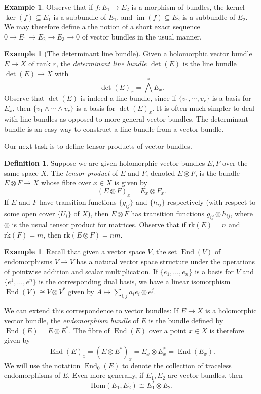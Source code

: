 \documentclass[10pt]{amsart}
\numberwithin{equation}{section}
\newcommand{\im}{\mathop{\mathrm{im}}}
\newcommand{\rk}{\mathrm{rk}}
\newcommand{\Hom}{\mathrm{Hom}}
\DeclareMathOperator{\End}{End}
\theoremstyle{plain}
\theoremstyle{definition}
\newtheorem{defn}[thm]{Definition}
\newtheorem{ex}[thm]{Example}
\theoremstyle{remark}
\begin{document}
\begin{ex}
Observe that if $f: E_1 \to E_2$ is a morphism of bundles, the kernel $\ker(f) \subseteq E_1$ is a subbundle of $E_1$, and $\im(f) \subseteq E_2$ is a subbundle of $E_2$. We may therefore define a the notion of a short exact sequence $0 \to E_1 \to E_2 \to E_3 \to 0$ of vector bundles in the usual manner.
\end{ex}

\begin{ex}[The determinant line bundle]
    Given a holomorphic vector bundle $E \to X$ of rank $r$, the \emph{determinant line bundle} $\det(E)$ is the line bundle $\det(E) \to X$ with 
    \[\det(E)_x = \bigwedge^{r} E_x.\]  
    Observe that $\det(E)$ is indeed a line bundle, since if $\{v_1, \cdots, v_r\}$ is a basis for $E_x$, then $\{v_1 \wedge \cdots \wedge v_r\}$ is a basis for $\det(E)_x$. It is often much simpler to deal with line bundles as opposed to more general vector bundles. The determinant bundle is an easy way to construct a line bundle from a vector bundle.
\end{ex}

 
Our next task is to define tensor products of vector bundles.

\begin{defn}
    Suppose we are given holomorphic vector bundles $E, F$ over the same space $X$. The \emph{tensor product} of $E$ and $F$, denoted $E \otimes F$, is the bundle $E \otimes F  \to X$ whose fibre over $x \in X$ is given by
    \[(E \otimes F)_x = E_x \otimes F_x.\]
    If $E$ and $F$ have transition functions $\{g_{ij}\}$ and $\{h_{ij}\}$ respectively (with respect to some open cover $\{U_i\}$ of $X$), then $E \otimes F$ has transition functions $g_{ij} \otimes h_{ij}$, where $\otimes$ is the usual tensor product for matrices. Observe that if $\rk(E) = n$ and $\rk(F) = m$, then $\rk(E \otimes F) = nm$.
\end{defn}

\begin{ex}
    Recall that given a vector space $V$, the set $\End(V)$ of endomorphisms $V \to V$ has a natural vector space structure under the operations of pointwise addition and scalar multiplication. If $\{e_1, \hdots, e_n\}$ is a basis for $V$ and $\{e^1, \hdots, e^n\}$ is the corresponding dual basis, we have a linear isomorphism $\End(V) \cong V \otimes V^*$ given by $A \mapsto \sum_{i,j} a_i e_i \otimes e^j$.

    We can extend this correspondence to vector bundles: If $E \to X$ is a holomorphic vector bundle, the \emph{endomorphism bundle} of $E$ is the bundle defined by $\End(E) = E \otimes E^*$. The fibre of $\End(E)$ over a point $x \in X$ is therefore given by 
    \[\End (E)_x = (E \otimes E^*)_x = E_x \otimes E_x^* = \End(E_x).\]
    We will use the notation $\End_0(E)$ to denote the collection of traceless endomorphisms of $E$. Even more generally, if $E_1, E_2$ are vector bundles, then 
    \[\Hom(E_1, E_2) \cong E_1^* \otimes E_2.\]
\end{ex}
\end{document}
